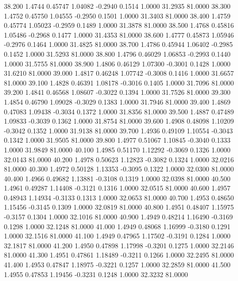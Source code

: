   38.200   1.4744   0.45747   1.04082  -0.2940   0.1514   1.0000  31.2935  81.0000
  38.300   1.4752   0.45750   1.04555  -0.2950   0.1501   1.0000  31.3403  81.0000
  38.400   1.4759   0.45774   1.05023  -0.2959   0.1489   1.0000  31.3878  81.0000
  38.500   1.4768   0.45816   1.05486  -0.2968   0.1477   1.0000  31.4353  81.0000
  38.600   1.4777   0.45873   1.05946  -0.2976   0.1464   1.0000  31.4825  81.0000
  38.700   1.4786   0.45944   1.06402  -0.2985   0.1452   1.0000  31.5293  81.0000
  38.800   1.4796   0.46029   1.06853  -0.2993   0.1440   1.0000  31.5755  81.0000
  38.900   1.4806   0.46129   1.07300  -0.3001   0.1428   1.0000  31.6210  81.0000
  39.000   1.4817   0.46248   1.07742  -0.3008   0.1416   1.0000  31.6657  81.0000
  39.100   1.4828   0.46391   1.08178  -0.3016   0.1405   1.0000  31.7096  81.0000
  39.200   1.4841   0.46568   1.08607  -0.3022   0.1394   1.0000  31.7526  81.0000
  39.300   1.4854   0.46790   1.09028  -0.3029   0.1383   1.0000  31.7946  81.0000
  39.400   1.4869   0.47083   1.09438  -0.3034   0.1372   1.0000  31.8356  81.0000
  39.500   1.4887   0.47489   1.09833  -0.3039   0.1362   1.0000  31.8754  81.0000
  39.600   1.4908   0.48098   1.10209  -0.3042   0.1352   1.0000  31.9138  81.0000
  39.700   1.4936   0.49109   1.10554  -0.3043   0.1342   1.0000  31.9505  81.0000
  39.800   1.4977   0.51067   1.10845  -0.3040   0.1333   1.0000  31.9849  81.0000
  40.100   1.4985   0.51170   1.12292  -0.3069   0.1326   1.0000  32.0143  81.0000
  40.200   1.4978   0.50623   1.12823  -0.3082   0.1324   1.0000  32.0216  81.0000
  40.300   1.4972   0.50128   1.13353  -0.3095   0.1322   1.0000  32.0300  81.0000
  40.400   1.4966   0.49682   1.13881  -0.3108   0.1319   1.0000  32.0398  81.0000
  40.500   1.4961   0.49287   1.14408  -0.3121   0.1316   1.0000  32.0515  81.0000
  40.600   1.4957   0.48943   1.14934  -0.3133   0.1313   1.0000  32.0653  81.0000
  40.700   1.4953   0.48650   1.15456  -0.3145   0.1309   1.0000  32.0819  81.0000
  40.800   1.4951   0.48407   1.15975  -0.3157   0.1304   1.0000  32.1016  81.0000
  40.900   1.4949   0.48214   1.16490  -0.3169   0.1298   1.0000  32.1248  81.0000
  41.000   1.4949   0.48068   1.16999  -0.3180   0.1291   1.0000  32.1516  81.0000
  41.100   1.4949   0.47965   1.17502  -0.3191   0.1284   1.0000  32.1817  81.0000
  41.200   1.4950   0.47898   1.17998  -0.3201   0.1275   1.0000  32.2146  81.0000
  41.300   1.4951   0.47861   1.18489  -0.3211   0.1266   1.0000  32.2495  81.0000
  41.400   1.4953   0.47847   1.18975  -0.3221   0.1257   1.0000  32.2859  81.0000
  41.500   1.4955   0.47853   1.19456  -0.3231   0.1248   1.0000  32.3232  81.0000
